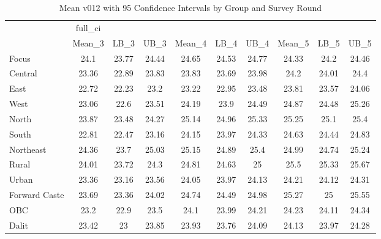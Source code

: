 \begin{table}[htbp]\centering
\caption{Mean v012 with 95 Confidence Intervals by Group and Survey Round}
\begin{tabular}{l*{9}{c}}
\hline\hline
                    &     full\_ci&            &            &            &            &            &            &            &            \\
                    &      Mean\_3&        LB\_3&        UB\_3&      Mean\_4&        LB\_4&        UB\_4&      Mean\_5&        LB\_5&        UB\_5\\
\hline
Focus               &        24.1&       23.77&       24.44&       24.65&       24.53&       24.77&       24.33&        24.2&       24.46\\
Central             &       23.36&       22.89&       23.83&       23.83&       23.69&       23.98&        24.2&       24.01&        24.4\\
East                &       22.72&       22.23&        23.2&       23.22&       22.95&       23.48&       23.81&       23.57&       24.06\\
West                &       23.06&        22.6&       23.51&       24.19&        23.9&       24.49&       24.87&       24.48&       25.26\\
North               &       23.87&       23.48&       24.27&       25.14&       24.96&       25.33&       25.25&        25.1&        25.4\\
South               &       22.81&       22.47&       23.16&       24.15&       23.97&       24.33&       24.63&       24.44&       24.83\\
Northeast           &       24.36&        23.7&       25.03&       25.15&       24.89&        25.4&       24.99&       24.74&       25.24\\
Rural               &       24.01&       23.72&        24.3&       24.81&       24.63&          25&        25.5&       25.33&       25.67\\
Urban               &       23.36&       23.16&       23.56&       24.05&       23.97&       24.13&       24.21&       24.12&       24.31\\
Forward Caste       &       23.69&       23.36&       24.02&       24.74&       24.49&       24.98&       25.27&          25&       25.55\\
OBC                 &        23.2&        22.9&        23.5&        24.1&       23.99&       24.21&       24.23&       24.11&       24.34\\
Dalit               &       23.42&          23&       23.85&       23.93&       23.76&       24.09&       24.13&       23.97&       24.28\\

\end{tabular}
\end{table}
